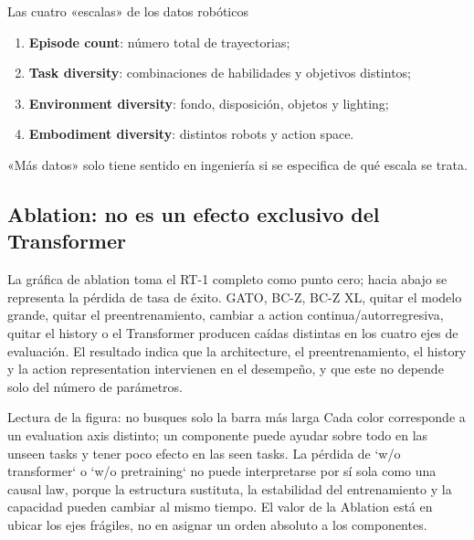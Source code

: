 
\begin{importantbox}{Las cuatro «escalas» de los datos robóticos}
\begin{enumerate}
  \item \textbf{Episode count}: número total de trayectorias;
  \item \textbf{Task diversity}: combinaciones de habilidades y objetivos distintos;
  \item \textbf{Environment diversity}: fondo, disposición, objetos y lighting;
  \item \textbf{Embodiment diversity}: distintos robots y action space.
\end{enumerate}
«Más datos» solo tiene sentido en ingeniería si se especifica de qué escala se trata.
\end{importantbox}

\subsection{Ablation: no es un efecto exclusivo del Transformer}

La gráfica de ablation toma el RT-1 completo como punto cero; hacia abajo se representa la pérdida de tasa de éxito. GATO, BC-Z, BC-Z XL, quitar el modelo grande, quitar el preentrenamiento, cambiar a action continua/autorregresiva, quitar el history o el Transformer producen caídas distintas en los cuatro ejes de evaluación. El resultado indica que la architecture, el preentrenamiento, el history y la action representation intervienen en el desempeño, y que este no depende solo del número de parámetros.


\begin{knowledgebox}{Lectura de la figura: no busques solo la barra más larga}
Cada color corresponde a un evaluation axis distinto; un componente puede ayudar sobre todo en las unseen tasks y tener poco efecto en las seen tasks. La pérdida de `w/o transformer` o `w/o pretraining` no puede interpretarse por sí sola como una causal law, porque la estructura sustituta, la estabilidad del entrenamiento y la capacidad pueden cambiar al mismo tiempo. El valor de la Ablation está en ubicar los ejes frágiles, no en asignar un orden absoluto a los componentes.
\end{knowledgebox}

